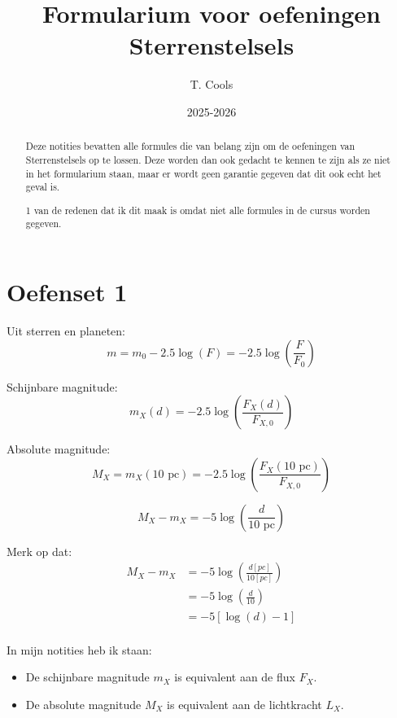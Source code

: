 \documentclass[a4paper,twoside]{article}
\title{Formularium voor oefeningen Sterrenstelsels}
\author{T. Cools}
\date{ 2025-2026}
\theoremstyle{definition}
\theoremstyle{plain}
\begin{document}
\maketitle

\begin{abstract}

Deze notities bevatten alle formules die van belang zijn om de oefeningen van Sterrenstelsels op te lossen.
Deze worden dan ook gedacht te kennen te zijn als ze niet in het formularium staan, maar er wordt geen garantie gegeven dat dit ook echt het geval is.

1 van de redenen dat ik dit maak is omdat niet alle formules in de cursus worden gegeven.
\end{abstract}

\section{Oefenset 1}

Uit sterren en planeten:
\[
m = m_0 -2.5\log\left(F\right) = -2.5\log\left(\frac{F}{F_{0}}\right)
\]

Schijnbare magnitude:
\begin{equation}
    m_X (d) = -2.5 \log \left( \frac{F_X (d)}{F_{X,0}} \right)
\end{equation}

Absolute magnitude:
\begin{equation}
    M_X = m_X(10 \text{ pc}) = -2.5 \log \left( \frac{F_X (10 \text{ pc})}{F_{X,0}} \right)
\end{equation}

\begin{equation}
    M_X - m_X = - 5 \log \left( \frac{d}{10 \text{ pc}} \right)
\end{equation}  

Merk op dat:
\begin{align*}
    M_X - m_X &= - 5 \log \left( \frac{d [pc]}{10 [pc]} \right) \\
    &= - 5 \log \left( \frac{d}{10} \right) \\
    &= - 5 \left[\log \left( d \right) - 1\right]  \\
\end{align*}

In mijn notities heb ik staan:
\begin{itemize}
    \item De schijnbare magnitude \(m_X\) is equivalent aan de flux \(F_X\).
    \item De absolute magnitude \(M_X\) is equivalent aan de lichtkracht \(L_X\).
\end{itemize}
\end{document}
